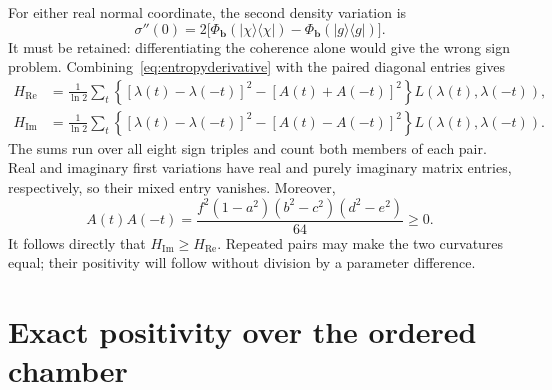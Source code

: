 \documentclass[11pt,a4paper]{article}
\newcommand{\ket}[1]{\lvert #1\rangle}
\newcommand{\bra}[1]{\langle #1\rvert}
\newcommand{\Ree}{\operatorname{Re}}
\newcommand{\Imm}{\operatorname{Im}}
\newcommand{\PhiB}{\Phi_{\boldsymbol b}}
\begin{document}
For either real normal coordinate, the second density variation is
\begin{equation}
 \sigma''(0)=2\big[
 \PhiB(\ket\chi\bra\chi)-\PhiB(\ket g\bra g)\big].
 \label{eq:normalization}
\end{equation}
It must be retained: differentiating the coherence alone would give
the wrong sign problem. Combining~\eqref{eq:entropyderivative} with
the paired diagonal entries gives
\begin{align}
 H_{\Ree}&=\frac1{\ln2}\sum_t
 \left\{[\lambda(t)-\lambda(-t)]^2
        -[A(t)+A(-t)]^2\right\}L(\lambda(t),\lambda(-t)),
 \label{eq:Hreal}\\
 H_{\Imm}&=\frac1{\ln2}\sum_t
 \left\{[\lambda(t)-\lambda(-t)]^2
        -[A(t)-A(-t)]^2\right\}L(\lambda(t),\lambda(-t)).
 \label{eq:Himag}
\end{align}
The sums run over all eight sign triples and count both members of
each pair. Real and imaginary first variations have real and purely
imaginary matrix entries, respectively, so their mixed entry vanishes.
Moreover,
\begin{equation}
 A(t)A(-t)=\frac{f^2(1-a^2)(b^2-c^2)(d^2-e^2)}{64}\ge0.
 \label{eq:phase}
\end{equation}
It follows directly that $H_{\Imm}\ge H_{\Ree}$. Repeated pairs
may make the two curvatures equal; their positivity will follow
without division by a parameter difference.

\section{Exact positivity over the ordered chamber}
\end{document}
